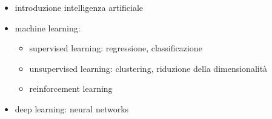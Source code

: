 
\begin{itemize}
  \item introduzione intelligenza artificiale
  \item machine learning:
  \begin{itemize}
    \item supervised learning: regressione, classificazione
    \item unsupervised learning: clustering, riduzione della dimensionalità
    \item reinforcement learning
  \end{itemize}
  \item deep learning: neural networks
\end{itemize}

